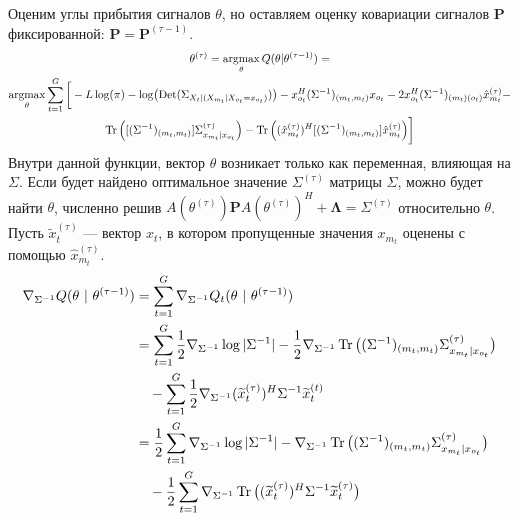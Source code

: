 \documentclass[11pt]{article}
\DeclareMathOperator*{\argmax}{argmax}
\DeclareMathOperator{\Det}{Det}
\begin{document}
\begin{center}
\fontsize{14}{18}\selectfont {}
\end{center}
Оценим углы прибытия сигналов $\theta$, но оставляем оценку ковариации сигналов $\mathbf{P}$ фиксированной: $\mathbf{P} = \mathbf{P}^{(\tau-1)}$.
\begin{equation*}
\begin{gathered}
\theta^{(\tau)}= \argmax_{\theta} Q(\theta | \theta^{(\tau-1)}) = \\
\argmax_{\theta} \sum_{t=1}^G \bigg[-L \log(\pi) - \log (\Det(\Sigma_{X_t|(X_{m_t}|X_{o_t}=x_{o_t})})) - x_{o_t}^H (\Sigma^{-1})_{(m_t, m_t)}x_{o_t} - 2 x_{o_t}^H (\Sigma^{-1})_{(m_t)(o_t)}\hat{x}_{m_t}^{(\tau)} - \\ \Tr \Big( [(\Sigma^{-1})_{(m_t, m_t)}]\Sigma^{(\tau)}_{x_{m_t}|x_{o_t}} \Big) - \Tr \Big((\hat{x}_{m_t}^{(\tau)})^H[(\Sigma^{-1})_{(m_t, m_t)}]\hat{x}_{m_t}^{(\tau)} \Big) \bigg]
\end{gathered}
\end{equation*}
Внутри данной функции, вектор $\theta$ возникает только как переменная, влияющая на $\Sigma$. Если будет найдено оптимальное значение $\Sigma^{(\tau)}$ матрицы $\Sigma$, можно будет найти $\theta$, 
численно решив $A(\theta^{(\tau)}) \mathbf{P}A(\theta^{(\tau)})^H + \mathbf{\Lambda} = \Sigma^{(\tau)}$ относительно $\theta$. \\
Пусть $\widetilde{x}_t^{(\tau)}$ --- вектор $x_t$, в котором пропущенные значения $x_{m_t}$ оценены с помощью $\hat{x}_{m_t}^{(\tau)}$.
\begin{align*}
\nabla_{\Sigma^{-1}} Q(\theta \text{ | } \theta^{(\tau-1)}) &= \sum_{t = 1}^{G} \nabla_{\Sigma^{-1}} Q_t (\theta \text{ | } \theta^{(\tau-1)}) \\
&= \sum_{t = 1}^{G} \frac{1}{2} \nabla_{\Sigma^{-1}} \log |\Sigma^{-1}| - \frac{1}{2} \nabla_{\Sigma^{-1}} \Tr \big( (\Sigma^{-1})_{(m_t, m_t)} \Sigma^{(\tau)}_{x_{m_t}|x_{o_t}} \big) \\
&\hspace{10pt} - \sum_{t = 1}^{G} \frac{1}{2} \nabla_{\Sigma^{-1}} (\widetilde{x}_t^{(\tau)})^H \Sigma^{-1} \widetilde{x}_t^{(t)} \\
&= \frac{1}{2} \sum_{t = 1}^{G} \nabla_{\Sigma^{-1}} \log |\Sigma^{-1}| - \nabla_{\Sigma^{-1}} \Tr \big( (\Sigma^{-1})_{(m_t, m_t)} \Sigma^{(\tau)}_{x_{m_t}|x_{o_t}} \big) \\
&\hspace{10pt} - \frac{1}{2} \sum_{t = 1}^{G} \nabla_{\Sigma^{-1}} \Tr \big( (\widetilde{x}_t^{(\tau)})^H \Sigma^{-1} \widetilde{x}_t^{(\tau)} \big)
\end{align*}
\end{document}
